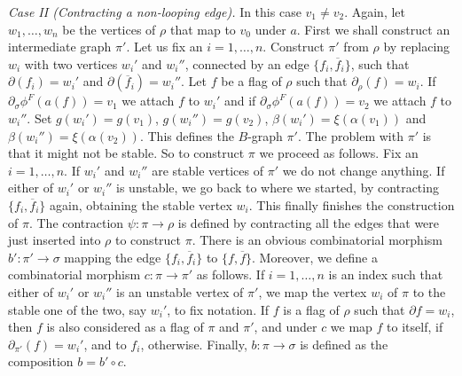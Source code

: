 \documentclass[11pt]{amsart}
\theoremstyle{definition}
\theoremstyle{remark}
\newcommand{\del}{\partial}
\newcommand{\comp}{\mathbin{{\scriptstyle\circ}}}
\newcommand{\ol}{\overline}
\newcommand{\s}{_{\sigma}}
\theoremstyle{plain}
\theoremstyle{definition}
\theoremstyle{remark}
\begin{document}
{\em Case II (Contracting a non-looping edge). } In this case \(v_1\not=v_2\).
Again, let \(w_1,\ldots, w_n\) be the
vertices of \(\rho\) that map to \(v_0\) under \(a\). First we shall construct an
intermediate graph \(\pi'\). Let us fix an
\(i=1,\ldots,n\). Construct \(\pi'\) from \(\rho\) by replacing \(w_i\) with two
vertices \(w_i'\) and \(w_i''\), connected by an
edge \(\{f_i,\ol{f}_i\}\), such that \(\del(f_i)=w_i'\) and \(\del(\ol{f}_i)=w_i''\).
Let \(f\) be a flag of \(\rho\) such that
\(\del_{\rho}(f)=w_i\). If \(\del\s\phi^F(a(f))=v_1\) we attach \(f\) to \(w_i'\) and
if \(\del\s\phi^F(a(f))=v_2\) we attach \(f\)
to \(w_i''\). Set \(g(w_i')=g(v_1)\), \(g(w_i'')=g(v_2)\),
\(\beta(w_i')=\xi(\alpha(v_1))\) and
\(\beta(w_i'')=\xi(\alpha(v_2))\). This defines the \(B\)-graph \(\pi'\). The problem
with \(\pi'\) is that it might not be
stable. So to construct \(\pi\) we proceed as follows. Fix an \(i=1,\ldots,n\). If
\(w_i'\) and \(w_i''\) are stable vertices of
\(\pi'\) we do not change anything. If either of \(w_i'\) or \(w_i''\) is unstable,
we go back to where we started, by
contracting \(\{f_i,\ol{f}_i\}\) again, obtaining the stable vertex \(w_i\). This
finally finishes the construction of
\(\pi\). The contraction \(\psi:\pi\rightarrow\rho\) is defined by contracting all
the edges that were just inserted into
\(\rho\) to construct \(\pi\). There is an obvious combinatorial morphism
\(b':\pi'\rightarrow\sigma\) mapping the edge
\(\{f_i,\ol{f}_i\}\) to \(\{f,\ol{f}\}\). Moreover, we define a combinatorial
morphism \(c:\pi\rightarrow\pi'\) as follows. If
\(i=1,\ldots,n\) is an index such that either of \(w_i'\) or \(w_i''\) is an unstable
vertex of \(\pi'\), we map the vertex
\(w_i\) of \(\pi\) to the stable one of the two, say \(w_i'\), to fix notation. If
\(f\) is a flag of \(\rho\) such that
\(\del{f}=w_i\), then \(f\) is also considered as a flag of \(\pi\) and \(\pi'\), and
under \(c\) we map \(f\) to itself, if
\(\del_{\pi'}(f)=w_i'\), and to \(f_i\), otherwise. Finally,
\(b:\pi\rightarrow\sigma\) is defined as the composition
\(b=b'\comp c\).
\end{document}
